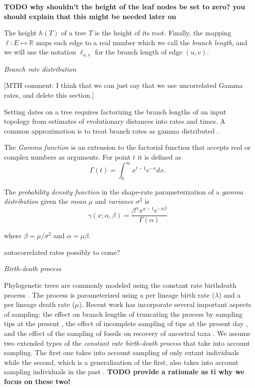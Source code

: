 \documentclass{llncs}
\newcommand{\ejmcomment}[1]{{\color{green} #1}}
\newcommand{\mthcomment}[1]{{[\color{red}MTH comment: #1]}}
\renewcommand{\subsection}[1]{%
\bigskip
\begin{center}
\begin{large}
\normalfont\itshape #1
\end{large}
\end{center}}
\begin{document}
{\bf TODO why shouldn't the height of the leaf nodes be set to zero? you should explain that this might be needed later on}

The height $h(T)$ of a tree $T$ is the height of its root. Finally, the mapping $\ell : E \mapsto \mathbb{R}$ maps
each edge to a real number which we call the {\em branch length}, and we will use the notation $\ell_{u,v}$ for
the branch length of edge $(u,v)$. 

\subsection{Branch rate distribution}

\mthcomment{I think that we can just say that we use uncorrelated Gamma rates, and delete this section.}

Setting dates on a tree requires factorizing the branch lengths of an input topology
from estimates of evolutionary distances into rates and times. 
A common approximation is to treat branch rates as gamma distributed \citep{Kishino2001}.


The {\em Gamma function} is an extension to the factorial function that accepts
real or complex numbers as arguments. For point $t$ it is defined as
$$\Gamma(t) = \int_0^\infty x^{t-1} e^{-x} dx.$$

The {\em probability density function} in the shape-rate parameterization of a
{\em gamma distribution} given the {\em mean} $\mu$ and {\em variance} $\sigma^2$ 
is
$$ \gamma(x;\alpha,\beta) = \frac{\beta^{\alpha}x^{a-1}e^{-x\beta}}{\Gamma(\alpha)} $$

where $\beta = \mu / \sigma^2$ and $\alpha = \mu \beta$.

\ejmcomment{autocorrelated rates possibly to come?}

\subsection{Birth-death process}
Phylogenetic trees are commonly modeled using the constant rate birth\textendash death process \citep{Kendall1948}.
The process is parameterized using a per lineage birth rate ($\lambda$) and a per lineage death rate ($\mu$).
Recent work has incorporate several important aspects of sampling:
the effect on branch lengths of truncating the process by sampling tips at the present \citep{Gernhard2008},
the effect of incomplete sampling of tips at the present day \citep{Stadler2009}, and the effect of the sampling
of fossils on recovery of ancestral taxa \citep{Stadler2010}.
We assume two extended types of the {\em constant rate birth-death process}
that take into account sampling. The
first one takes into account sampling of only extant individuals
\citep{Stadler2009} while the second, which is a generalization of the first,
also takes into account sampling individuals in the past \citep{Stadler2010}.
{\bf TODO provide a rationale as ti why we focus on these two!} 
\end{document}

